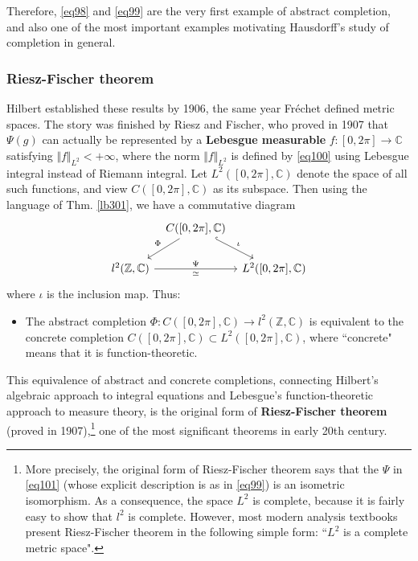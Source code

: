 \documentclass[12pt,b5paper,notitlepage]{article}
\theoremstyle{definition}
\theoremstyle{plain}
\newcommand{\Cbb}{\mathbb C}
\newcommand{\Zbb}{\mathbb Z}
\numberwithin{equation}{section}
\begin{document}
Therefore, \eqref{eq98} and \eqref{eq99} are the very first example of abstract completion, and also one of the most important examples motivating Hausdorff's study of completion in general. %


\subsubsection{Riesz-Fischer theorem}


Hilbert established these results by  1906, the same year Fr\'echet defined metric spaces. The story was finished by Riesz and Fischer, who proved in 1907 that $\Psi(g)$ can actually be represented by a \textbf{Lebesgue measurable} $f:[0,2\pi]\rightarrow\Cbb$ satisfying $\Vert f\Vert_{L^2}<+\infty$, where the norm $\Vert f\Vert_{L^2}$ is defined by \eqref{eq100} using Lebesgue integral instead of Riemann integral. Let $L^2([0,2\pi],\Cbb)$ denote the space of all such functions, and view $C([0,2\pi],\Cbb)$ as its subspace. Then using the language of Thm. \ref{lb301}, we have a commutative diagram
\begin{equation}\label{eq101}
\begin{tikzcd}[column sep=tiny]
                     & C([0,2\pi],\Cbb) \arrow[ld,"\Phi"'] \arrow[rd,hook,"\iota"] &   \\
l^2(\Zbb,\Cbb) \arrow[rr,"\simeq"',"\Psi"] &                         & L^2([0,2\pi],\Cbb)
\end{tikzcd}
\end{equation}
where $\iota$ is the inclusion map. Thus:
\begin{itemize}
\item The abstract completion $\Phi:C([0,2\pi],\Cbb)\rightarrow l^2(\Zbb,\Cbb)$ is equivalent to the concrete completion $C([0,2\pi],\Cbb)\subset L^2([0,2\pi],\Cbb)$, where ``concrete" means that it is function-theoretic.
\end{itemize}
This equivalence of abstract and concrete completions, connecting Hilbert's algebraic  approach to integral equations and Lebesgue's function-theoretic approach to measure theory, is the original form of \textbf{Riesz-Fischer theorem}   (proved in 1907),\footnote{More precisely, the original form of Riesz-Fischer theorem says that the $\Psi$ in \eqref{eq101} (whose explicit description is as in \eqref{eq99}) is an isometric isomorphism. As a consequence, the space $L^2$ is complete, because it is fairly easy to show that $l^2$ is complete. However, most modern analysis textbooks present Riesz-Fischer theorem in the following simple  form: ``$L^2$ is a complete metric space".} one of the most significant theorems in early 20th century.
\end{document}
